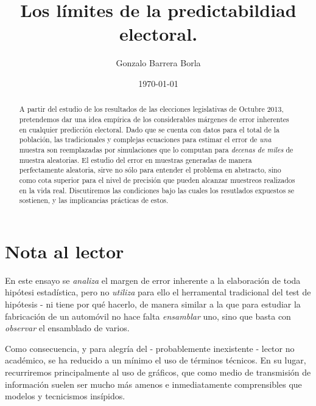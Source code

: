 \documentclass[12pt, a4paper]{article}
\begin{document}
\title{Los l\'imites de la predictabildiad electoral.}
\author{Gonzalo Barrera Borla}
\date{\today}

\maketitle

\pagebreak

\begin{abstract}
	A partir del estudio de los resultados de las elecciones legislativas de Octubre 2013, pretendemos dar una idea emp\'irica de los considerables m\'argenes de error inherentes en cualquier predicci\'on electoral. Dado que se cuenta con datos para el total de la poblaci\'on, las tradicionales y complejas ecuaciones para estimar el error de \emph{una} muestra son reemplazadas por simulaciones que lo computan para \emph{decenas de miles} de muestra aleatorias.
	El estudio del error en muestras generadas de manera perfectamente aleatoria, sirve no s\'olo para entender el problema en abstracto, sino como cota superior para el nivel de precisi\'on que pueden alcanzar muestreos realizados en la vida real. Discutiremos las condiciones bajo las cuales los resutlados expuestos se sostienen, y las implicancias pr\'acticas de estos.
\end{abstract}

\pagebreak

\tableofcontents

\pagebreak

\section{Nota al lector}

En este ensayo se \emph{analiza} el margen de error inherente a la elaboraci\'on de toda hip\'otesi estad\'istica, pero no \emph{utiliza} para ello el herramental tradicional del test de hip\'otesis - ni tiene por qu\'e hacerlo, de manera similar a la que para estudiar la fabricaci\'on de un autom\'ovil no hace falta \emph{ensamblar} uno, sino que basta con \emph{observar} el ensamblado de varios.

Como consecuencia, y para alegr\'ia del - probablemente inexistente - lector no acad\'emico, se ha reducido a un m\'inimo el uso de t\'erminos t\'ecnicos. En su lugar, recurriremos principalmente al uso de gr\'aficos, que como medio de transmisi\'on de informaci\'on suelen ser mucho m\'as amenos e inmediatamente comprensibles que modelos y tecnicismos ins\'ipidos.
\end{document}
